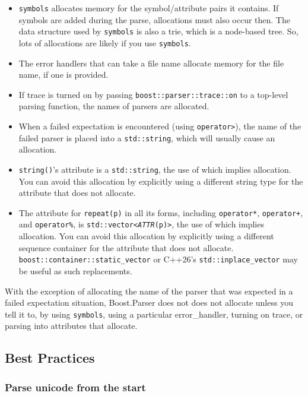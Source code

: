 \begin{itemize}
\item
  \texttt{symbols} allocates memory for the symbol/attribute pairs it contains. If symbols are added during the parse, allocations must also occur then. The data structure used by \texttt{symbols} is also a trie, which is a node-based tree. So, lots of allocations are likely if you use \texttt{symbols}.
\item
  The error handlers that can take a file name allocate memory for the file name, if one is provided.
\item
  If trace is turned on by passing \texttt{boost::parser::trace::on} to a top-level parsing function, the names of parsers are allocated.
\item
  When a failed expectation is encountered (using \texttt{operator>}), the name of the failed parser is placed into a \texttt{std::string}, which will usually cause an allocation.
\item
  \texttt{string()}'s attribute is a \texttt{std::string}, the use of which implies allocation. You can avoid this allocation by explicitly using a different string type for the attribute that does not allocate.
\item
  The attribute for \texttt{repeat(p)} in all its forms, including \texttt{operator*}, \texttt{operator+}, and \texttt{operator\%}, is \texttt{std::vector<}\emph{\texttt{ATTR}}\texttt{(p)>}, the use of which implies allocation. You can avoid this allocation by explicitly using a different sequence container for the attribute that does not allocate. \texttt{boost::container::static\_vector} or C++26's \texttt{std::inplace\_vector} may be useful as such replacements.
\end{itemize}

With the exception of allocating the name of the parser that was expected in a failed expectation situation, Boost.Parser does not does not allocate unless you tell it to, by using \texttt{symbols}, using a particular error\_handler, turning on trace, or parsing into attributes that allocate.

\subsection{Best Practices}

\subsubsection{Parse unicode from the start}

